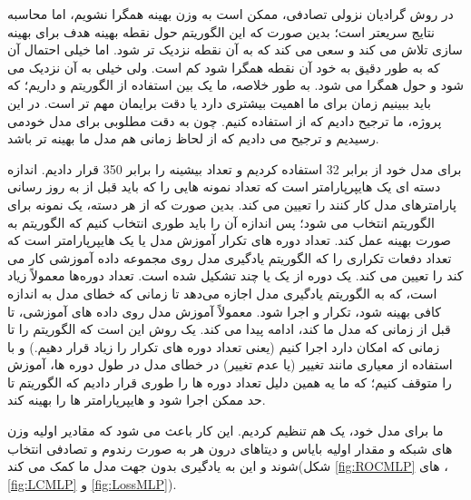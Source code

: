 \documentclass[12pt,onecolumn,a4paper]{article}
\begin{document}

در روش گرادیان نزولی تصادفی، ممکن است به وزن بهینه همگرا نشویم، اما محاسبه نتایج سریعتر است؛ بدین صورت که این الگوریتم حول نقطه بهینه هدف برای بهینه سازی تلاش می کند و سعی می کند که به آن نقطه نزدیک تر شود. اما خیلی احتمال آن که به طور دقیق به خود آن نقطه همگرا شود کم است. ولی خیلی به آن نزدیک می شود و حول  همگرا می شود. به طور خلاصه، ما یک  بین استفاده از الگوریتم  و  داریم؛ که باید ببینیم زمان برای ما اهمیت بیشتری دارد یا دقت برایمان مهم تر است. در این پروژه، ما ترجیح دادیم که از  استفاده کنیم. چون به دقت مطلوبی برای مدل خودمی رسیدیم و ترجیح می دادیم که از لحاظ زمانی هم مدل ما بهینه تر باشد.

برای مدل خود از  برابر 32 استفاده کردیم و تعداد بیشینه  را برابر 350 قرار دادیم.
اندازه دسته ای یک هایپرپارامتر است که تعداد نمونه هایی را که باید قبل از به روز رسانی پارامترهای مدل کار کنند را تعیین می کند. بدین صورت که از هر دسته، یک نمونه برای الگوریتم  انتخاب می شود؛ پس اندازه آن را باید طوری انتخاب کنیم که الگوریتم  به صورت بهینه عمل کند.
تعداد دوره های تکرار آموزش مدل یا  یک هایپرپارامتر است که تعداد دفعات تکراری را که الگوریتم یادگیری مدل روی مجموعه داده آموزشی کار می کند را تعیین می کند. یک دوره از یک یا چند  تشکیل شده است. تعداد دوره‌ها معمولاً زیاد است، که به الگوریتم یادگیری مدل اجازه می‌دهد تا زمانی که خطای مدل به اندازه کافی بهینه شود، تکرار و اجرا شود. معمولاً آموزش مدل روی داده های آموزشی، تا قبل از زمانی که مدل ما  کند، ادامه پیدا می کند. یک روش این است که الگوریتم را تا زمانی که امکان دارد اجرا کنیم (یعنی تعداد دوره های تکرار را زیاد قرار دهیم.) و با استفاده از معیاری مانند تغییر (یا عدم تغییر) در خطای مدل در طول دوره ها، آموزش را متوقف کنیم؛ که ما یه همین دلیل تعداد دوره ها را طوری قرار دادیم که الگوریتم تا حد ممکن اجرا شود و هایپرپارامتر ها را بهینه کند.

ما برای مدل خود، یک  هم تنظیم کردیم. این کار باعث می شود که مقادیر اولیه وزن های شبکه و مقدار اولیه بایاس و دیتاهای درون هر  به صورت رندوم و تصادفی انتخاب شوند و این به یادگیری بدون جهت مدل ما کمک می کند(شکل \ref{fig:ROCMLP} های ، \ref{fig:LCMLP} و \ref{fig:LossMLP}).
\end{document}
